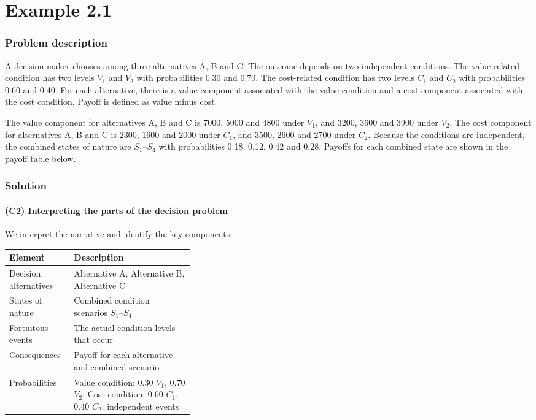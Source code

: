 \chapter{Example 2.1}\label{sec:example2-1}

\subsection{Problem description}\label{subsec:example2-1-problem}

A decision maker chooses among three alternatives A, B and C. The outcome depends on two independent conditions. The value-related condition has two levels \(V_1\) and \(V_2\) with probabilities 0.30 and 0.70. The cost-related condition has two levels \(C_1\) and \(C_2\) with probabilities 0.60 and 0.40. For each alternative, there is a value component associated with the value condition and a cost component associated with the cost condition. Payoff is defined as value minus cost.

The value component for alternatives A, B and C is 7000, 5000 and 4800 under \(V_1\), and 3200, 3600 and 3900 under \(V_2\). The cost component for alternatives A, B and C is 2300, 1600 and 2000 under \(C_1\), and 3500, 2600 and 2700 under \(C_2\). Because the conditions are independent, the combined states of nature are \(S_1\)--\(S_4\) with probabilities 0.18, 0.12, 0.42 and 0.28. Payoffs for each combined state are shown in the payoff table below.

\subsection{Solution}\label{subsec:example2-1-solution}

\subsubsection{(C2) Interpreting the parts of the decision problem}\label{subsubsec:example2-1-c2}

We interpret the narrative and identify the key components.

\begin{center}
	\begin{tabularx}{\linewidth}{@{}L{0.35\linewidth}Y@{}}
		\toprule
		Element & Description \\
		\midrule
		Decision alternatives & Alternative A, Alternative B, Alternative C \\
		States of nature & Combined condition scenarios \(S_1\)--\(S_4\) \\
		Fortuitous events & The actual condition levels that occur \\
		Consequences & Payoff for each alternative and combined scenario \\
		Probabilities & Value condition: 0.30 \(V_1\), 0.70 \(V_2\); Cost condition: 0.60 \(C_1\), 0.40 \(C_2\); independent events \\
		\bottomrule
	\end{tabularx}
\end{center}

